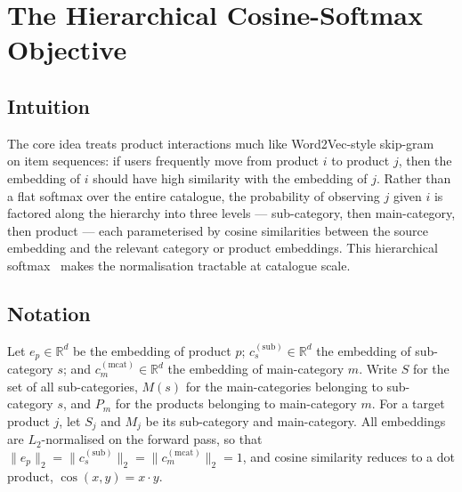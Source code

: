 \section{The Hierarchical Cosine-Softmax Objective}
\label{sec:emb-model}

\subsection{Intuition}
The core idea treats product interactions much like Word2Vec-style
skip-gram~\cite{Mikolov13} on item sequences: if users frequently move from
product $i$ to product $j$, then the embedding of $i$ should have high
similarity with the embedding of $j$. Rather than a flat softmax over the
entire catalogue, the probability of observing $j$ given $i$ is factored along
the hierarchy into three levels --- sub-category, then main-category, then
product --- each parameterised by cosine similarities between the source
embedding and the relevant category or product embeddings. This hierarchical
softmax~\cite{Morin05} makes the normalisation tractable at catalogue scale.

\subsection{Notation}
Let $e_p \in \mathbb{R}^{d}$ be the embedding of product $p$;
$c^{(\text{sub})}_s \in \mathbb{R}^{d}$ the embedding of sub-category $s$; and
$c^{(\text{mcat})}_m \in \mathbb{R}^{d}$ the embedding of main-category $m$.
Write $S$ for the set of all sub-categories, $M(s)$ for the main-categories
belonging to sub-category $s$, and $P_m$ for the products belonging to
main-category $m$. For a target product $j$, let $S_j$ and $M_j$ be its
sub-category and main-category. All embeddings are $L_2$-normalised on the
forward pass, so that $\lVert e_p\rVert_2 = \lVert c^{(\text{sub})}_s\rVert_2 =
\lVert c^{(\text{mcat})}_m\rVert_2 = 1$, and cosine similarity reduces to a dot
product, $\cos(x,y) = x\cdot y$.

